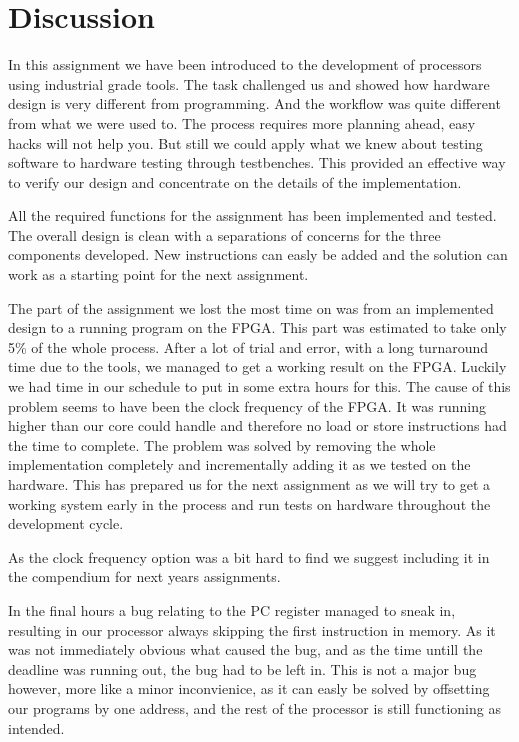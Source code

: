 \section{Discussion}

In this assignment we have been introduced to the development of processors using 
industrial grade tools. The task challenged us and showed how hardware design is
very different from programming. And the workflow was quite different from what we
were used to. The process requires more planning ahead, easy hacks will not help you.
But still we could apply what we knew about testing software to hardware testing 
through testbenches. This provided an effective way to verify our design and concentrate
on the details of the implementation. 

All the required functions for the assignment has been implemented and tested. The
overall design is clean with a separations of concerns for the three components developed. 
New instructions can easly be added and the solution can work as a starting point for the
next assignment. 

The part of the assignment we lost the most time on was from an implemented design to a running
program on the FPGA. This part was estimated to take only 5\% of the whole process. 
After a lot of trial and error, with a long turnaround time due to the tools, we managed to get 
a working result on the FPGA. Luckily we had time in our schedule to put in some extra hours for this.
The cause of this problem seems to have been the clock frequency of the FPGA. It was running higher 
than our core could handle and therefore no load or store instructions had the time to complete. 
The problem was solved by removing the whole implementation completely and incrementally adding
it as we tested on the hardware. This has prepared us for the next assignment as we will try
to get a working system early in the process and run tests on hardware throughout the development
cycle. 

As the clock frequency option was a bit hard to find we suggest including it in the compendium
for next years assignments. 

In the final hours a bug relating to the PC register managed to sneak in, resulting in our processor always skipping the
first instruction in memory. As it was not immediately obvious what caused the bug, and as the time untill the deadline was
running out, the bug had to be left in. This is not a major bug however, more like a minor inconvienice, as it can easly be 
solved by offsetting our programs by one address, and the rest of the processor is still functioning as intended.
